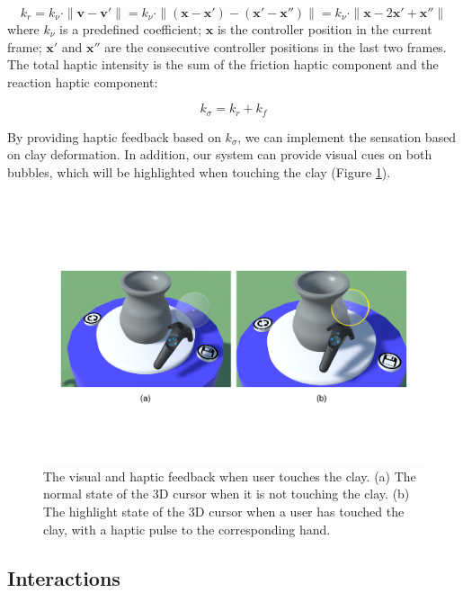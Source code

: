 \documentclass{svjour3}                     %
\begin{document}
{\begin{equation}
k_{r} = k_{\nu} \cdot \|\mathbf{v} - \mathbf{v}'\| = k_{\nu} \cdot \|(\mathbf{x}-\mathbf{x}') - (\mathbf{x}'-\mathbf{x}'')\| = k_{\nu} \cdot \|\mathbf{x}-2\mathbf{x}'+\mathbf{x}''\|
\end{equation}
where $k_{\nu}$ is a predefined coefficient; $\mathbf{x}$ is the controller position in the current frame; $\mathbf{x}'$ and $\mathbf{x}''$ are the consecutive controller positions in the last two frames.
The total haptic intensity is the sum of the friction haptic component and the reaction haptic component:

\begin{equation}
k_{\sigma} = k_{r} + k_{f}
\end{equation}

By providing haptic feedback based on $k_{\sigma}$, we can implement the sensation based on clay deformation.
In addition, our system can provide visual cues on both bubbles, which will be highlighted when touching the clay (Figure \ref{fig:highlight}).


\begin{figure}
\includegraphics[width=\textwidth]{fig10}
\caption{The visual and haptic feedback when user touches the clay. (a) The normal state of the 3D cursor when it is not touching the clay. (b) The highlight state of the 3D cursor when a user has touched the clay, with a haptic pulse to the corresponding hand.}
\label{fig:highlight}
\end{figure}
}

\subsection{Interactions}
\label{sec:interactions}
\end{document}
